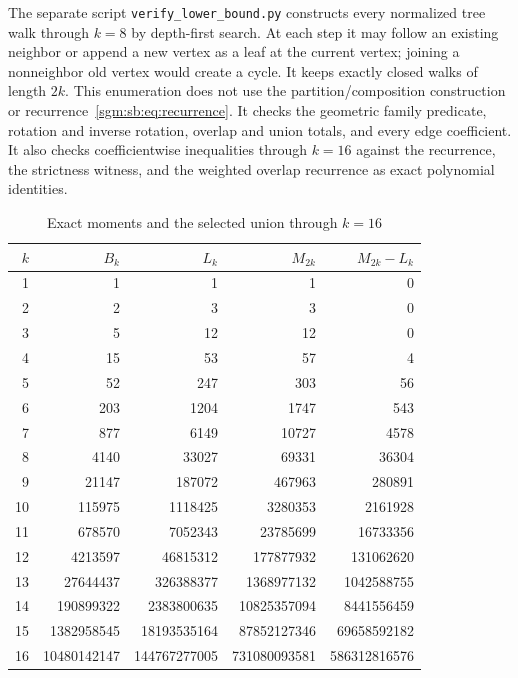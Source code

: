 \documentclass[11pt,letterpaper]{article}
\theoremstyle{remark}\newtheorem{remark}[theorem]{Remark}
\theoremstyle{definition}\newtheorem{definition}[theorem]{Definition}
\begin{document}
The separate script \texttt{verify\_lower\_bound.py} constructs every normalized tree walk through $k=8$ by depth-first search. At each step it may follow an existing neighbor or append a new vertex as a leaf at the current vertex; joining a nonneighbor old vertex would create a cycle. It keeps exactly closed walks of length $2k$. This enumeration does not use the partition/composition construction or recurrence~\eqref{sgm:sb:eq:recurrence}. It checks the geometric family predicate, rotation and inverse rotation, overlap and union totals, and every edge coefficient. It also checks coefficientwise inequalities through $k=16$ against the recurrence, the strictness witness, and the weighted overlap recurrence as exact polynomial identities.

\begin{table}[htbp]\centering\small
\caption{Exact moments and the selected union through $k=16$}\label{sgm:sb:tab:exact}
\begin{tabular}{r r r r r}\toprule
$k$ & $B_k$ & $L_k$ & $M_{2k}$ & $M_{2k}-L_k$ \\\midrule
1 & 1 & 1 & 1 & 0 \\
2 & 2 & 3 & 3 & 0 \\
3 & 5 & 12 & 12 & 0 \\
4 & 15 & 53 & 57 & 4 \\
5 & 52 & 247 & 303 & 56 \\
6 & 203 & 1204 & 1747 & 543 \\
7 & 877 & 6149 & 10727 & 4578 \\
8 & 4140 & 33027 & 69331 & 36304 \\
9 & 21147 & 187072 & 467963 & 280891 \\
10 & 115975 & 1118425 & 3280353 & 2161928 \\
11 & 678570 & 7052343 & 23785699 & 16733356 \\
12 & 4213597 & 46815312 & 177877932 & 131062620 \\
13 & 27644437 & 326388377 & 1368977132 & 1042588755 \\
14 & 190899322 & 2383800635 & 10825357094 & 8441556459 \\
15 & 1382958545 & 18193535164 & 87852127346 & 69658592182 \\
16 & 10480142147 & 144767277005 & 731080093581 & 586312816576 \\
\bottomrule\end{tabular}
\end{table}
\end{document}
